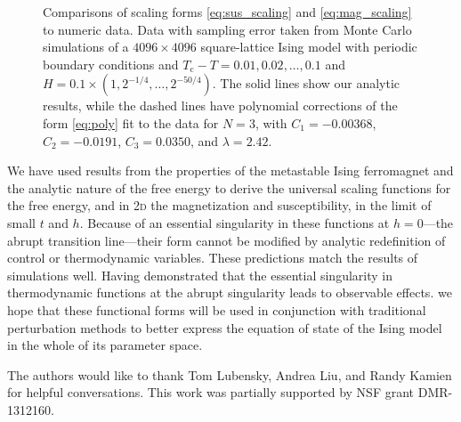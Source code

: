 \documentclass[aps,prl,reprint]{revtex4-1}
\def\arcsinh{\mathop{\mathrm{arcsinh}}\nolimits}
\def\arccosh{\mathop{\mathrm{arccosh}}\nolimits}
\def\c{\mathrm c}
\def\fM{\mathcal M}  %
\def\sq{\mathrm{sq}}
\def\twodee{\textsc{2d} }
\begin{document}

\begin{figure}
  
  \caption{
    Comparisons of scaling forms \eqref{eq:sus_scaling} and
    \eqref{eq:mag_scaling} to numeric data.  Data with
    sampling error taken from Monte Carlo simulations of a $4096\times4096$
    square-lattice Ising model with periodic boundary conditions and $T_\c-T=0.01,0.02,\ldots,0.1$ and
    $H=0.1\times(1,2^{-1/4},\ldots,2^{-50/4})$. The solid lines show our
    analytic results, while the dashed lines have polynomial corrections of
    the form \eqref{eq:poly} fit to the data for $N=3$, with $C_1=-0.00368$,
    $C_2=-0.0191$, $C_3=0.0350$, and $\lambda=2.42$.
  }
  \label{fig:scaling_fits}
\end{figure}

We have used results from the properties of the metastable Ising ferromagnet
and the analytic nature of the free energy to derive the universal scaling
functions for the free energy, and in \twodee the magnetization and
susceptibility, in the limit of small $t$ and $h$. Because of an essential
singularity in these functions at $h=0$---the abrupt transition line---their
form cannot be modified by analytic redefinition of control or thermodynamic
variables. These predictions match the results of simulations well. Having
demonstrated that the essential singularity in thermodynamic functions at the
abrupt singularity leads to observable effects. we hope that these functional
forms will be used in conjunction with traditional perturbation methods to
better express the equation of state of the Ising model in the whole of its
parameter space.

\begin{acknowledgments}
  The authors would like to thank Tom Lubensky, Andrea Liu, and Randy Kamien
  for helpful conversations. This work was partially supported by NSF grant
  DMR-1312160.
\end{acknowledgments}


\end{document}
